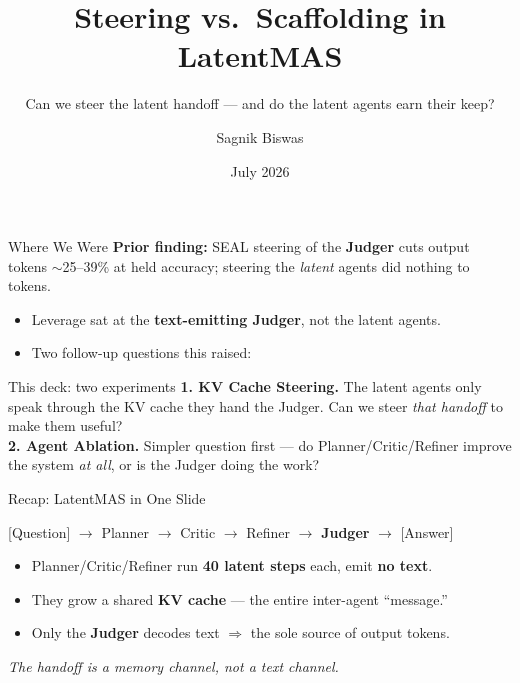 \documentclass{beamer}
\title{Steering vs.\ Scaffolding in LatentMAS}
\subtitle{Can we steer the latent handoff --- and do the latent agents earn their keep?}
\author{Sagnik Biswas}
\date{July 2026}
\begin{document}
\begin{frame}
    \titlepage
    \vspace{-1cm}
\end{frame}

\begin{frame}{Where We Were}
    \textbf{Prior finding:} SEAL steering of the \textbf{Judger} cuts output tokens $\sim$25--39\% at held accuracy; steering the \emph{latent} agents did nothing to tokens.
    \vspace{0.3cm}
    \begin{itemize}
        \item Leverage sat at the \textbf{text-emitting Judger}, not the latent agents.
        \item Two follow-up questions this raised:
    \end{itemize}
    \vspace{0.2cm}
    \begin{block}{This deck: two experiments}
        \textbf{1. KV Cache Steering.} The latent agents only speak through the KV cache they hand the Judger. Can we steer \emph{that handoff} to make them useful?
        \\[0.2cm]
        \textbf{2. Agent Ablation.} Simpler question first --- do Planner/Critic/Refiner improve the system \emph{at all}, or is the Judger doing the work?
    \end{block}
\end{frame}

\begin{frame}{Recap: LatentMAS in One Slide}
    \begin{center}
        [Question] $\rightarrow$ Planner $\rightarrow$ Critic $\rightarrow$ Refiner $\rightarrow$ \textbf{Judger} $\rightarrow$ [Answer]
    \end{center}
    \vspace{0.3cm}
    \begin{itemize}
        \item Planner/Critic/Refiner run \textbf{40 latent steps} each, emit \textbf{no text}.
        \item They grow a shared \textbf{KV cache} --- the entire inter-agent ``message.''
        \item Only the \textbf{Judger} decodes text $\Rightarrow$ the sole source of output tokens.
    \end{itemize}
    \vspace{0.3cm}
    \begin{center}\textit{The handoff is a memory channel, not a text channel.}\end{center}
\end{frame}
\end{document}
